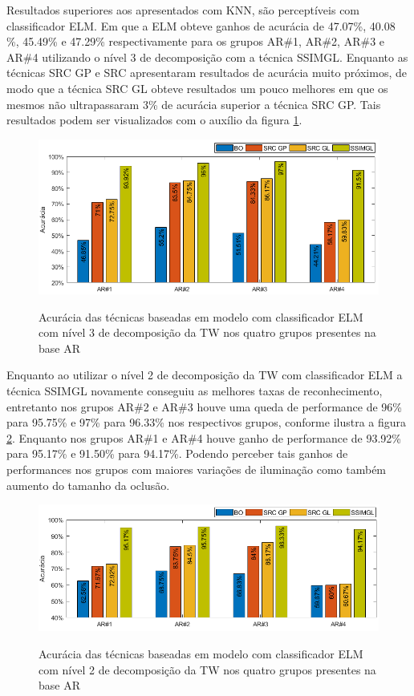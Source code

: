 Resultados superiores aos apresentados com KNN, são perceptíveis com classificador ELM. Em que a ELM obteve ganhos de acurácia de 47.07\%, 40.08 \%, 45.49\% e 47.29\% respectivamente para os grupos AR\#1, AR\#2, AR\#3 e AR\#4 utilizando o nível 3 de decomposição com a técnica SSIMGL. Enquanto as técnicas SRC GP e SRC apresentaram resultados de acurácia muito próximos, de modo que a técnica SRC GL obteve resultados um pouco melhores em que os mesmos não ultrapassaram 3\% de acurácia superior a técnica SRC GP. Tais resultados podem ser visualizados com o auxílio da figura \ref{fig:acuracia_modelo_ELM}.



\begin{figure}[H]
\centering
\caption{Acurácia das técnicas baseadas em modelo com classificador ELM com nível 3 de decomposição da TW nos quatro grupos presentes na base AR}
\includegraphics[scale=0.52]{imgs4/acuracia_modelo_ELM}
\label{fig:acuracia_modelo_ELM}
\end{figure}


Enquanto ao utilizar o nível 2 de decomposição da TW com classificador ELM a técnica SSIMGL novamente conseguiu as melhores taxas de reconhecimento, entretanto nos grupos AR\#2 e AR\#3 houve uma queda de performance de 96\% para 95.75\% e 97\% para 96.33\% nos respectivos grupos, conforme ilustra a figura \ref{fig:acuracia_modelo_ELM_nivel2}. Enquanto nos grupos AR\#1 e AR\#4 houve ganho de performance de 93.92\% para 95.17\% e 91.50\% para 94.17\%. Podendo perceber tais ganhos de performances nos grupos com maiores variações de iluminação como também aumento do tamanho da oclusão.


\begin{figure}[H]
\centering
\caption{Acurácia das técnicas baseadas em modelo com classificador ELM com nível 2 de decomposição da TW nos quatro grupos presentes na base AR}
\includegraphics[scale=0.52]{imgs4/acuracia/nivel_one_two/ELM_nivel2_modelo}
\label{fig:acuracia_modelo_ELM_nivel2}
\end{figure}

